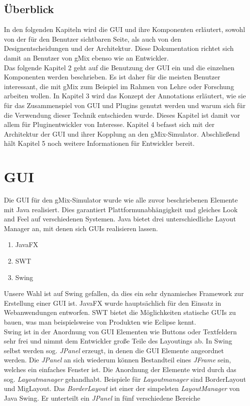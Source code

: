 \documentclass[a4paper, 11pt]{article} %
\begin{document}
\subsection{Überblick} %
\label{sub:überblick}
In den folgenden  Kapiteln wird die GUI und ihre Komponenten erläutert, sowohl von der für den Benutzer sichtbaren Seite, als auch von den Designentscheidungen und der Architektur. Diese Dokumentation richtet sich damit an Benutzer von gMix ebenso wie an Entwickler.\\
Das folgende Kapitel 2 geht auf die Benutzung der GUI ein und die einzelnen Komponenten werden beschrieben. Es ist daher für die meisten Benutzer interessant, die mit gMix zum Beispiel im Rahmen von Lehre oder Forschung arbeiten wollen. In Kapitel 3 wird das Konzept der Annotations erläutert, wie sie für das Zusammenspiel von GUI und Plugins genutzt werden und warum sich für die Verwendung dieser Technik entschieden wurde. Dieses Kapitel ist damit vor allem für Pluginentwickler von Interesse. Kapitel 4 befasst sich mit der Architektur der GUI und ihrer Kopplung an den gMix-Simulator. Abschließend hält Kapitel 5 noch weitere Informationen für Entwickler bereit.


\section{GUI}
\label{sub:guielemente}
Die GUI für den gMix-Simulator wurde wie alle zuvor beschriebenen Elemente mit Java realisiert. Dies garantiert Plattformunabhängigkeit und gleiches Look and Feel auf verschiedenen Systemen. Java bietet drei unterschiedliche Layout Manager an, mit denen sich GUIs realisieren lassen.
\begin{enumerate}
\item JavaFX
\item SWT
\item Swing
\end{enumerate}
Unsere Wahl ist auf Swing gefallen, da dies ein sehr dynamisches Framework zur Erstellung einer GUI ist. JavaFX wurde hauptsächlich für den Einsatz in Webanwendungen entworfen. SWT bietet die Möglichkeiten statische GUIs zu bauen, was man beispielsweise von Produkten wie  Eclipse kennt.\\

Swing ist in der Anordnung von GUI Elementen wie Buttons oder Textfeldern sehr frei und nimmt dem Entwickler große Teile des Layoutings ab. In Swing selbst werden sog. \emph{JPanel} erzeugt, in denen die GUI Elemente angeordnet werden. Die \emph{JPanel} an sich wiederum können Bestandteil eines \emph{JFrame} sein, welches ein einfaches Fenster ist. Die Anordnung der Elemente wird durch das sog. \emph{Layoutmanager} gehandhabt. Beispiele für \emph{Layoutmanager} sind BorderLayout und MigLayout. Das \emph{BorderLayout} ist einer der simpelsten \emph{LayoutManager} von Java Swing. Er unterteilt ein \emph{JPanel} in fünf verschiedene Bereiche
\end{document}
